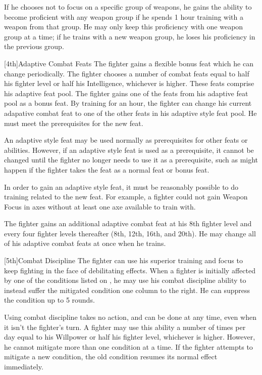 If he chooses not to focus on a specific group of weapons, he gains the ability to become proficient with any weapon group if he spends 1 hour training with a weapon from that group.
He may only keep this proficiency with one weapon group at a time; if he trains with a new weapon group, he loses his proficiency in the previous group.

[4th]{Adaptive Combat Feats}
The fighter gains a flexible bonus feat which he can change periodically.
The fighter chooses a number of combat feats equal to half his fighter level or half his Intelligence, whichever is higher.
These feats comprise his adaptive feat pool.
The fighter gains one of the feats from his adaptive feat pool as a bonus feat.
By training for an hour, the fighter can change his current adapative combat feat to one of the other feats in his adaptive style feat pool.
He must meet the prerequisites for the new feat.

\par An adaptive style feat may be used normally as prerequisites for other feats or abilities.
However, if an adaptive style feat is used as a prerequisite, it cannot be changed until the fighter no longer needs to use it as a prerequisite, such as might happen if the fighter takes the feat as a normal feat or bonus feat.

\par In order to gain an adaptive style feat, it must be reasonably possible to do training related to the new feat.
For example, a fighter could not gain Weapon Focus in axes without at least one axe available to train with.

The fighter gains an additional adaptive combat feat at his 8th fighter level and every four fighter levels thereafter (8th, 12th, 16th, and 20th).
He may change all of his adaptive combat feats at once when he trains.

[5th]{Combat Discipline}
The fighter can use his superior training and focus to keep fighting in the face of debilitating effects.
When a fighter is initially affected by one of the conditions listed on , he may use his combat discipline ability to instead suffer the mitigated condition one column to the right.
He can suppress the condition up to 5 rounds.

\par Using combat discipline takes no action, and can be done at any time, even when it isn't the fighter's turn.
A fighter may use this ability a number of times per day equal to his Willpower or half his fighter level, whichever is higher.
However, he cannot mitigate more than one condition at a time.
If the fighter attempts to mitigate a new condition, the old condition resumes its normal effect immediately.

